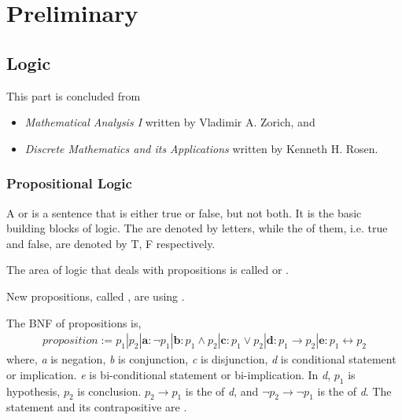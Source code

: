 \section{Preliminary}

\subsection{Logic}

This part is concluded from 
\begin{itemize}
  \item \emph{Mathematical Analysis I} written by Vladimir A. Zorich, and
  \item \emph{Discrete Mathematics and its Applications} written by Kenneth H. Rosen.
\end{itemize}

\crule

\subsubsection{Propositional Logic}

A  or  is a  
sentence that is either true or false, but not both.
It is the basic building blocks of logic.
The  are denoted by letters,
while the  of them, 
i.e. true and false, are denoted by T, F respectively.

The area of logic that deals with propositions is called 
 or .

New propositions, called , are 
using 
.

The BNF of propositions is, 
\begin{align*}
  proposition := p_1 | p_2 | 
    \textbf{a}: \neg{p_1} | 
    \textbf{b}: p_1 \wedge p_2 | 
    \textbf{c}: p_1 \vee p_2 | 
    \textbf{d}: p_1 \rightarrow p_2 | 
    \textbf{e}: p_1 \leftrightarrow p_2
\end{align*}
where, \emph{a} is negation, \emph{b} is conjunction, \emph{c} is disjunction,
\emph{d} is conditional statement or implication.
\emph{e} is bi-conditional statement or bi-implication.
In \emph{d}, $p_1$ is hypothesis, $p_2$ is conclusion.
$p_2 \rightarrow p_1$ is the  of \emph{d},
and $\neg{p_2} \rightarrow \neg{p_1}$ is the  of \emph{d}.
The statement and its contrapositive are .

